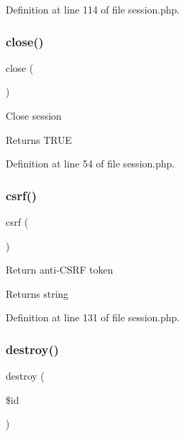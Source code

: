 Definition at line 114 of file session.\+php.

\hypertarget{class_d_b_1_1_s_q_l_1_1_session_aa69c8bf1f1dcf4e72552efff1fe3e87e}{}\label{class_d_b_1_1_s_q_l_1_1_session_aa69c8bf1f1dcf4e72552efff1fe3e87e} 
\subsubsection{\texorpdfstring{close()}{close()}}
{\footnotesize\ttfamily close (\begin{DoxyParamCaption}{ }\end{DoxyParamCaption})}

Close session \begin{DoxyReturn}{Returns}
T\+R\+UE 
\end{DoxyReturn}


Definition at line 54 of file session.\+php.

\hypertarget{class_d_b_1_1_s_q_l_1_1_session_a048d24aa22a28f92f1f3a7e3d323f45e}{}\label{class_d_b_1_1_s_q_l_1_1_session_a048d24aa22a28f92f1f3a7e3d323f45e} 
\subsubsection{\texorpdfstring{csrf()}{csrf()}}
{\footnotesize\ttfamily csrf (\begin{DoxyParamCaption}{ }\end{DoxyParamCaption})}

Return anti-\/\+C\+S\+RF token \begin{DoxyReturn}{Returns}
string 
\end{DoxyReturn}


Definition at line 131 of file session.\+php.

\hypertarget{class_d_b_1_1_s_q_l_1_1_session_a726fa8a4b4b187b9ca32ba427aac8137}{}\label{class_d_b_1_1_s_q_l_1_1_session_a726fa8a4b4b187b9ca32ba427aac8137} 
\subsubsection{\texorpdfstring{destroy()}{destroy()}}
{\footnotesize\ttfamily destroy (\begin{DoxyParamCaption}\item[{}]{\$id }\end{DoxyParamCaption})}

